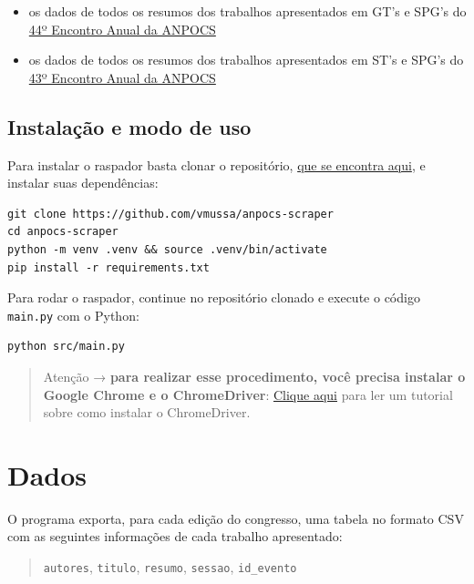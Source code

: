 \documentclass[
]{book}
\begin{document}
\begin{itemize}
\item
  os dados de todos os resumos dos trabalhos apresentados em GT's e SPG's do \href{https://www.anpocs2020.sinteseeventos.com.br/}{44º Encontro Anual da ANPOCS}
\item
  os dados de todos os resumos dos trabalhos apresentados em ST's e SPG's do \href{http://anpocs.com/index.php/43-encontro-anual-2019/2750-encontros-anuais/43-encontro/2301-resumos-sts-e-spgs}{43º Encontro Anual da ANPOCS}
\end{itemize}

\hypertarget{instalauxe7uxe3o-e-modo-de-uso}{%
\subsection{Instalação e modo de uso}\label{instalauxe7uxe3o-e-modo-de-uso}}

Para instalar o raspador basta clonar o repositório, \href{https://github.com/vmussa/anpocs-scraper}{que se encontra aqui}, e instalar suas dependências:

\begin{verbatim}
git clone https://github.com/vmussa/anpocs-scraper
cd anpocs-scraper
python -m venv .venv && source .venv/bin/activate
pip install -r requirements.txt
\end{verbatim}

Para rodar o raspador, continue no repositório clonado e execute o código \texttt{main.py} com o Python:

\begin{verbatim}
python src/main.py
\end{verbatim}

\begin{quote}
Atenção → \textbf{para realizar esse procedimento, você precisa instalar o Google Chrome e o ChromeDriver}: \href{https://chromedriver.chromium.org/getting-started}{Clique aqui} para ler um tutorial sobre como instalar o ChromeDriver.
\end{quote}

\hypertarget{dados-2}{%
\section{Dados}\label{dados-2}}

O programa exporta, para cada edição do congresso, uma tabela no formato CSV com as seguintes informações de cada trabalho apresentado:

\begin{quote}
\texttt{autores}, \texttt{titulo}, \texttt{resumo}, \texttt{sessao}, \texttt{id\_evento}
\end{quote}
\end{document}
